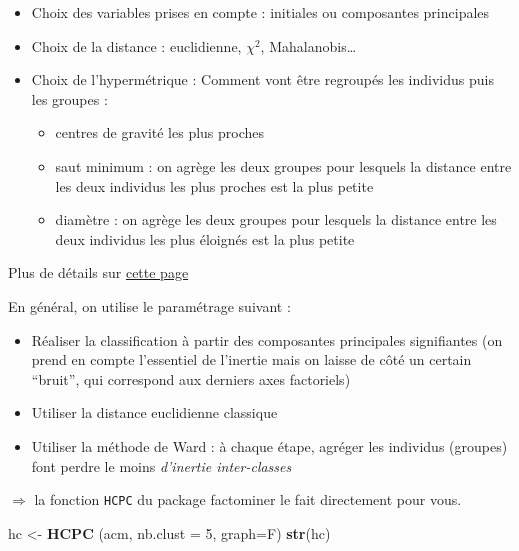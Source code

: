 \documentclass[]{book}
\newenvironment{Shaded}{\begin{snugshade}}{\end{snugshade}}
\newcommand{\DataTypeTok}[1]{\textcolor[rgb]{0.13,0.29,0.53}{#1}}
\newcommand{\DecValTok}[1]{\textcolor[rgb]{0.00,0.00,0.81}{#1}}
\newcommand{\KeywordTok}[1]{\textcolor[rgb]{0.13,0.29,0.53}{\textbf{#1}}}
\newcommand{\NormalTok}[1]{#1}
\newcommand{\StringTok}[1]{\textcolor[rgb]{0.31,0.60,0.02}{#1}}
\providecommand{\tightlist}{%
  \setlength{\itemsep}{0pt}\setlength{\parskip}{0pt}}
\begin{document}
\begin{itemize}
\tightlist
\item
  Choix des variables prises en compte : initiales ou composantes principales
\item
  Choix de la distance : euclidienne, \(\chi^2\), Mahalanobis\ldots{}
\item
  Choix de l'hypermétrique : Comment vont être regroupés les individus puis les groupes :

  \begin{itemize}
  \tightlist
  \item
    centres de gravité les plus proches
  \item
    saut minimum : on agrège les deux groupes pour lesquels la distance entre les deux individus les plus proches est la plus petite
  \item
    diamètre : on agrège les deux groupes pour lesquels la distance entre les deux individus les plus éloignés est la plus petite
  \end{itemize}
\end{itemize}

Plus de détails sur \href{http://maths.cnam.fr/IMG/pdf/Classification-2008-2.pdf}{cette page}

En général, on utilise le paramétrage suivant :

\begin{itemize}
\tightlist
\item
  Réaliser la classification à partir des composantes principales signifiantes (on prend en compte l'essentiel de l'inertie mais on laisse de côté un certain ``bruit'', qui correspond aux derniers axes factoriels)
\item
  Utiliser la distance euclidienne classique
\item
  Utiliser la méthode de Ward : à chaque étape, agréger les individus (groupes) font perdre le moins \emph{d'inertie inter-classes}
\end{itemize}

\(\Rightarrow\) la fonction \texttt{HCPC} du package factominer le fait directement pour vous.

\begin{Shaded}
\begin{Highlighting}[]
\NormalTok{hc <-}\StringTok{ }\KeywordTok{HCPC}\NormalTok{ (acm, }\DataTypeTok{nb.clust =} \DecValTok{5}\NormalTok{, }\DataTypeTok{graph=}\NormalTok{F)}
\KeywordTok{str}\NormalTok{(hc)}
\end{Highlighting}
\end{Shaded}
\end{document}
